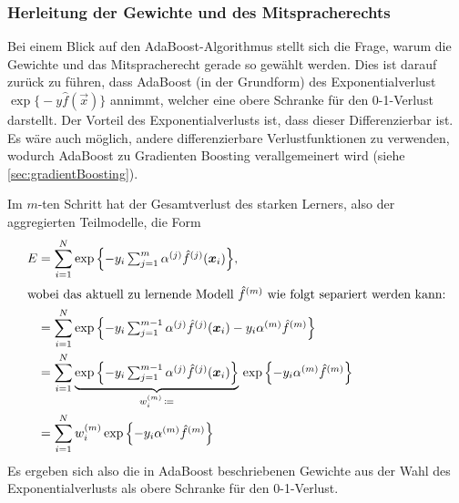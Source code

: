 			\subsubsection{Herleitung der Gewichte und des Mitspracherechts}
				Bei einem Blick auf den AdaBoost-Algorithmus stellt sich die Frage, warum die Gewichte und das Mitspracherecht gerade so gewählt werden. Dies ist darauf zurück zu führen, dass AdaBoost (in der Grundform) des Exponentialverlust \( \exp\big\{ -y \hat{f}(\vec{x}) \big\} \) annimmt, welcher eine obere Schranke für den 0-1-Verlust darstellt. Der Vorteil des Exponentialverlusts ist, dass dieser Differenzierbar ist. Es wäre auch möglich, andere differenzierbare Verlustfunktionen zu verwenden, wodurch AdaBoost zu Gradienten Boosting verallgemeinert wird (siehe \autoref{sec:gradientBoosting}).

				Im \(m\)-ten Schritt hat der Gesamtverlust des starken Lerners, also der aggregierten Teilmodelle, die Form
				\begin{align}
					E
						&= \sum_{i = 1}^{N} \exp\Big\{ { \textstyle -y_i \sum_{j = 1}^{m} \alpha^{(j)} \hat{f}^{(j)}(\vec{x}_i) } \Big\}, \\
					\intertext{wobei das aktuell zu lernende Modell \( \hat{f}^{(m)} \) wie folgt separiert werden kann:}
						&= \sum_{i = 1}^{N} \exp\Big\{ { \textstyle -y_i \sum_{j = 1}^{m - 1} \alpha^{(j)} \hat{f}^{(j)}(\vec{x}_i) - y_i \alpha^{(m)} \hat{f}^{(m)} } \Big\} \\
						&= \sum_{i = 1}^{N} \underbrace{\exp\Big\{ { \textstyle  -y_i \sum_{j = 1}^{m - 1} \alpha^{(j)} \hat{f}^{(j)}(\vec{x}_i) } \Big\}}_{w_i^{(m)} \,\coloneqq} \, \exp\Big\{ { \textstyle  -y_i \alpha^{(m)} \hat{f}^{(m)} } \Big\} \\
						&= \sum_{i = 1}^{N} w_i^{(m)} \exp\Big\{ { \textstyle  -y_i \alpha^{(m)} \hat{f}^{(m)} } \Big\}
				\end{align}
				Es ergeben sich also die in AdaBoost beschriebenen Gewichte aus der Wahl des Exponentialverlusts als obere Schranke für den 0-1-Verlust.

